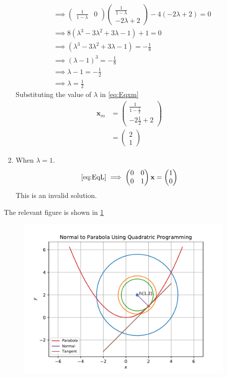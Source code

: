 \documentclass[12pt]{article}
\providecommand{\brak}[1]{\ensuremath{\left(#1\right)}}
\newcommand{\myvec}[1]{\ensuremath{\begin{pmatrix}#1\end{pmatrix}}}
\let\vec\mathbf
\begin{document}
\begin{enumerate}
\begin{enumerate}
\begin{align}
	&\implies \myvec{\frac{1}{1-\lambda} & 0}\myvec{\frac{1}{1-\lambda} \\ -2\lambda+2} - 4\brak{-2\lambda+2} = 0 \\
	&\implies 8\brak{\lambda^3 -3\lambda^2+3\lambda-1} +1 = 0 \\ 
	&\implies \brak{\lambda^3 -3\lambda^2+3\lambda-1}  = -\frac{1}{8} \\ 
	& \implies \brak{\lambda-1}^3 = -\frac{1}{8} \\ 
	& \implies \lambda-1 = -\frac{1}{2} \\
	& \implies \lambda = \frac{1}{2}
\end{align}
Substituting the value of $\lambda$ in    \eqref{eq:Eqxm}
\begin{align}
	\vec{x}_{m} &= \myvec{ \frac{1}{1-\frac{1}{2}} \\ -2\frac{1}{2}+2} \\
	&= \myvec{2 \\ 1}
\end{align}
\item When $\lambda = 1$. 
\begin{align}
	\eqref{eq:EqL} \implies \myvec{0 & 0 \\ 0&1}\vec{x} = \myvec{1 \\ 0}
\end{align}
This is an invalid solution. 
\end{enumerate}
The relevant figure is shown in \ref{fig:Fig1}
\begin{figure}[!h]
	\begin{center}
		\includegraphics[width=\columnwidth]{figs/problem23.pdf}
	\end{center}
\caption{}
\label{fig:Fig1}
\end{figure}
\end{enumerate}
\end{document}
